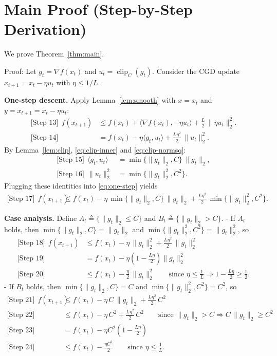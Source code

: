 \documentclass[11pt]{article}
\begin{document}
\section*{Main Proof (Step-by-Step Derivation)}
We prove Theorem~\ref{thm:main}.

\noindent
Proof:
Let $g_t=\nabla f(x_t)$ and $u_t=\operatorname{clip}_C(g_t)$. Consider the CGD update $x_{t+1}=x_t-\eta u_t$ with $\eta\le 1/L$.

\noindent
\textbf{One-step descent.}
Apply Lemma~\ref{lem:smooth} with $x=x_t$ and $y=x_{t+1}=x_t-\eta u_t$:
\begin{align}
\text{[Step 13]}\ \ f(x_{t+1})
&\le f(x_t) + \langle \nabla f(x_t), -\eta u_t\rangle + \frac{L}{2}\,\|\eta u_t\|_2^2. \nonumber\\
\text{[Step 14]}\ \ 
&= f(x_t) - \eta \langle g_t, u_t\rangle + \frac{L\eta^2}{2}\,\|u_t\|_2^2. \label{eq:one-step}
\end{align}
By Lemma~\ref{lem:clip}, \eqref{eq:clip-inner} and \eqref{eq:clip-normsq}:
\begin{align}
\text{[Step 15]}\ \ \langle g_t, u_t\rangle &= \min\{\|g_t\|_2, C\}\,\|g_t\|_2, \\
\text{[Step 16]}\ \ \|u_t\|_2^2 &= \min\{\|g_t\|_2^2, C^2\}.
\end{align}
Plugging these identities into \eqref{eq:one-step} yields
\begin{align}
\text{[Step 17]}\ \ f(x_{t+1})
&\le f(x_t) - \eta \,\min\{\|g_t\|_2, C\}\,\|g_t\|_2 + \frac{L\eta^2}{2}\,\min\{\|g_t\|_2^2, C^2\}. \label{eq:master}
\end{align}

\noindent
\textbf{Case analysis.}
Define $A_t\triangleq \{\|g_t\|_2 \le C\}$ and $B_t\triangleq \{\|g_t\|_2 > C\}$.
- If $A_t$ holds, then $\min\{\|g_t\|_2, C\}=\|g_t\|_2$ and $\min\{\|g_t\|_2^2, C^2\}=\|g_t\|_2^2$, so
\begin{align}
\text{[Step 18]}\ \ f(x_{t+1})
&\le f(x_t) - \eta\,\|g_t\|_2^2 + \frac{L\eta^2}{2}\,\|g_t\|_2^2 \nonumber\\
\text{[Step 19]}\ \ 
&= f(x_t) - \eta\left(1-\frac{L\eta}{2}\right)\|g_t\|_2^2 \nonumber\\
\text{[Step 20]}\ \ 
&\le f(x_t) - \frac{\eta}{2}\,\|g_t\|_2^2 \qquad \text{since }\eta\le \frac{1}{L}\Rightarrow 1-\frac{L\eta}{2}\ge \frac{1}{2}. \label{eq:small-grad}
\end{align}
- If $B_t$ holds, then $\min\{\|g_t\|_2, C\}=C$ and $\min\{\|g_t\|_2^2, C^2\}=C^2$, so
\begin{align}
\text{[Step 21]}\ \ f(x_{t+1})
&\le f(x_t) - \eta\, C\,\|g_t\|_2 + \frac{L\eta^2}{2}\,C^2 \nonumber\\
\text{[Step 22]}\ \ 
&\le f(x_t) - \eta\, C^2 + \frac{L\eta^2}{2}\,C^2 \qquad \text{since $\|g_t\|_2>C\Rightarrow C\,\|g_t\|_2 \ge C^2$} \nonumber\\
\text{[Step 23]}\ \ 
&= f(x_t) - \eta C^2\left(1-\frac{L\eta}{2}\right) \nonumber\\
\text{[Step 24]}\ \ 
&\le f(x_t) - \frac{\eta C^2}{2} \qquad \text{since }\eta\le \frac{1}{L}. \label{eq:large-grad}
\end{align}
\end{document}
